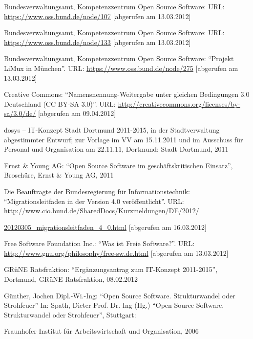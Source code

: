 \documentclass[a4paper]{scrartcl}
\begin{document}
{
Bundesverwaltungsamt, Kompetenzzentrum Open Source Software: URL:
\href{https://www.oss.bund.de/node/107}{{http}}\href{https://www.oss.bund.de/node/107}{{s://www.oss.bund.de/node/107}}
{{[abgerufen am
13.03.2012]}}}

{
{Bundesverwaltungsamt, Kompetenzzentrum Open Source
Software: URL:
}\href{https://www.oss.bund.de/node/133}{{http}}\href{https://www.oss.bund.de/node/133}{{{s}}}\href{https://www.oss.bund.de/node/133}{{://www.oss.bund.de/node/133}}
{{[abgerufen am
13.03.2012]}}}

{
{{Bu}}{{ndesverwaltungsamt,
Kompetenzzentrum}}{ Open Source
Software}{{:
``Projekt LiMux in München''. URL:
}}\url{https://www.oss.bund.de/node/275}{{
}}{{[abgerufen am 13.03.2012]}}}

{
{{Creative Commons:
``Namensnennung-Weitergabe unter gleichen Bedingungen 3.0
Deutschland (CC BY-SA 3.0)''. URL:
}}\url{http://creativecommons.org/licenses/by-sa/3.0/de/}{{
[abgerufen am 09.04.2012]}}}


{
dosys -- IT-Konzept Stadt Dortmund 2011-2015, in der Stadtverwaltung
abgestimmter Entwurf; zur Vorlage im VV am 15.11.2011 und im Ausschuss
für Personal und Organisation am 22.11.11, Dortmund: Stadt Dortmund,
2011}

{
Ernst \& Young AG: ``Open Source Software im
geschäftskritischen Einsatz'', Broschüre, Ernst \&
Young AG, 2011}

{
{{Die Beauftragte der
Bundesregierung für Informationstechnik:
``Migrationsleitfaden in der Version 4.0
veröffentlicht''. URL:
}}\href{http://www.cio.bund.de/SharedDocs/Kurzmeldungen/DE/2012/20120305_migrationsleitfaden_4_0.html}{{http://www.cio.bund.de/SharedDocs/Kurzmeldungen/DE/2012/}}}

{
\href{http://www.cio.bund.de/SharedDocs/Kurzmeldungen/DE/2012/20120305_migrationsleitfaden_4_0.html}{{20120305\_migrationsleitfaden\_4\_0.html}}{{
[abgerufen am }}{{16.03.2012]}}}

{
{{Free Software Foundation Inc.:
``Was ist Freie Software?''. URL:
}}\url{http://www.gnu.org/philosophy/free-sw.de.html}{{
}}{{[abgerufen am 13.03.2012]}}}

{
GRüNE Ratsfraktion: ``Ergänzungsantrag zum IT-Konzept
2011-2015'', Dortmund, GRüNE Ratsfraktion,
08.02.2012}

{
Günther, Jochen Dipl.-Wi.-Ing: ``Open Source Software.
Strukturwandel oder Strohfeuer'' In: Spath, Dieter
Prof. Dr.-Ing (Hg.) ``Open Source Software. Strukturwandel
oder Strohfeuer'', Stuttgart: }

Fraunhofer Institut für Arbeitswirtschaft und Organisation, 2006
\end{document}
